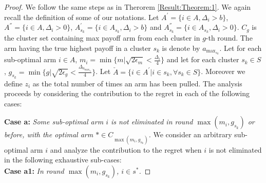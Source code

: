 \begin{proof}
We follow the same steps as in Therorem \ref{Result:Theorem:1}. We again recall the definition of some of our notations. Let $A^{'}=\lbrace i \in A,\Delta_{i}> b\rbrace$,  $A^{''}=\lbrace i \in A, \Delta_{i} > 0\rbrace$, $A^{'}_{s_{k}}=\lbrace i \in A_{s_{k}},\Delta_{i}> b\rbrace$ and $A^{''}_{s_{k}}=\lbrace i \in A_{s_{k}}, \Delta_{i} > 0 \rbrace$. $C_{g}$ is the cluster set containing max payoff arm from each cluster in $g$-th round. The arm having the true highest payoff in a cluster $s_{k}$ is denote by $a_{\max_{s_{k}}}$. Let for each sub-optimal arm ${i}\in A$, $m_{i}=\min{\lbrace m|\sqrt{2\epsilon_{m}} < \frac{\Delta_{i}}{4} \rbrace}$ and let for each cluster $s_{k}\in S$, $g_{s_{k}}=\min{\lbrace g|\sqrt{2\epsilon_{g}} < \frac{\Delta_{a_{\max_{s_{k}}}}}{4} \rbrace}$. Let $\check{A}=\lbrace {i}\in A^{'} | {i}\in s_{k} , \forall s_{k}\in S \rbrace$. Moreover we define $z_i$ as the total number of times an arm has been pulled. The analysis proceeds by considering the contribution to the regret in each of the following cases:

\textbf{Case a:} \textit{Some sub-optimal arm ${i}$ is not eliminated in round $\max(m_{i},g_{s_{k}})$ or before, with the optimal arm ${*}\in C_{\max(m_{i},g_{s_{k}})}$.}
We consider an arbitrary sub-optimal arm ${i}$ and analyze the contribution to the regret when $i$ is not eliminated in the following exhaustive sub-cases:\\
\textbf{Case a1:} \textit{In round $\max(m_{i},g_{s_{k}})$, ${i} \in s^{*}$.}


\end{proof}
